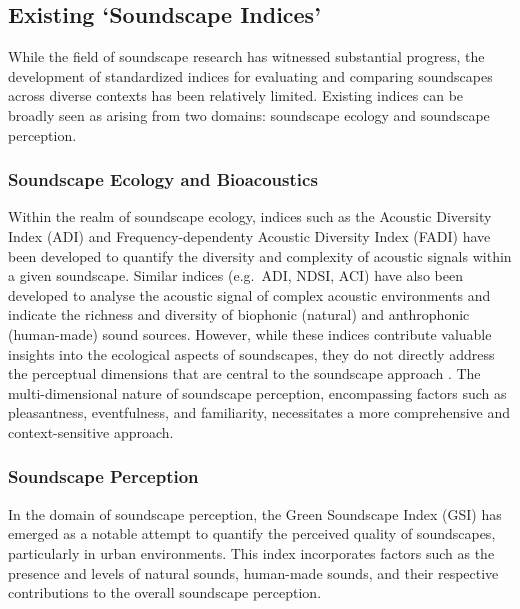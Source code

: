 \documentclass[
  authoryear,
  preprint,
  3p]{elsarticle}
\begin{document}
\subsection{Existing `Soundscape
Indices'}\label{sec-existing-soundscape-indices}

While the field of soundscape research has witnessed substantial
progress, the development of standardized indices for evaluating and
comparing soundscapes across diverse contexts has been relatively
limited. Existing indices can be broadly seen as arising from two
domains: soundscape ecology and soundscape perception.

\subsubsection{Soundscape Ecology and
Bioacoustics}\label{soundscape-ecology-and-bioacoustics}

Within the realm of soundscape ecology, indices such as the Acoustic
Diversity Index (ADI) and Frequency-dependenty Acoustic Diversity Index
(FADI) \citep{Xu2023frequency} have been developed to quantify the
diversity and complexity of acoustic signals within a given soundscape.
Similar indices (e.g.~ADI, NDSI, ACI) have also been developed to
analyse the acoustic signal of complex acoustic environments and
indicate the richness and diversity of biophonic (natural) and
anthrophonic (human-made) sound sources. However, while these indices
contribute valuable insights into the ecological aspects of soundscapes,
they do not directly address the perceptual dimensions that are central
to the soundscape approach \citep{SchulteFortkamp2023Soundscapes}. The
multi-dimensional nature of soundscape perception, encompassing factors
such as pleasantness, eventfulness, and familiarity, necessitates a more
comprehensive and context-sensitive approach.

\subsubsection{Soundscape Perception}\label{soundscape-perception}

In the domain of soundscape perception, the Green Soundscape Index (GSI)
\citep{Kogan2018Green} has emerged as a notable attempt to quantify the
perceived quality of soundscapes, particularly in urban environments.
This index incorporates factors such as the presence and levels of
natural sounds, human-made sounds, and their respective contributions to
the overall soundscape perception.
\end{document}
